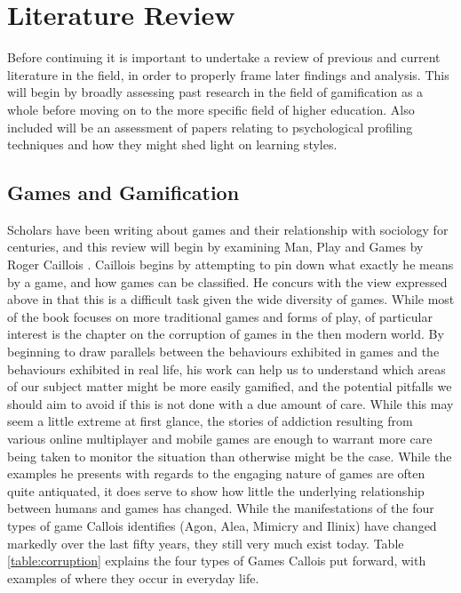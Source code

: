 \documentclass[12pt,a4paper,twoside]{report}
\begin{document}
\chapter{Literature Review}
Before continuing it is important to undertake a review of previous and current literature in the field, in order to properly frame later findings and analysis. This will begin by broadly assessing past research in the field of gamification as a whole before moving on to the more specific field of higher education. Also included will be an assessment of papers relating to psychological profiling techniques and how they might shed light on learning styles.

\section{Games and Gamification}
Scholars have been writing about games and their relationship with sociology for centuries, and this review will begin by examining Man, Play and Games by Roger Caillois \cite{caillois1961man}. Caillois begins by attempting to pin down what exactly he means by a game, and how games can be classified. He concurs with the view expressed above in that this is a difficult task given the wide diversity of games. While most of the book focuses on more traditional games and forms of play, of particular interest is the chapter on the corruption of games in the then modern world. By beginning to draw parallels between the behaviours exhibited in games and the behaviours exhibited in real life, his work can help us to understand which areas of our subject matter might be more easily gamified, and the potential pitfalls we should aim to avoid if this is not done with a due amount of care. While this may seem a little extreme at first glance, the stories of addiction resulting from various online multiplayer and mobile games are enough to warrant more care being taken to monitor the situation than otherwise might be the case. While the examples he presents with regards to the engaging nature of games are often quite antiquated, it does serve to show how little the underlying relationship between humans and games has changed. While the manifestations of the four types of game Callois identifies (Agon, Alea, Mimicry and Ilinix) have changed markedly over the last fifty years, they still very much exist today. Table \ref{table:corruption} explains the four types of Games Callois put forward, with examples of where they occur in everyday life.
\end{document}
